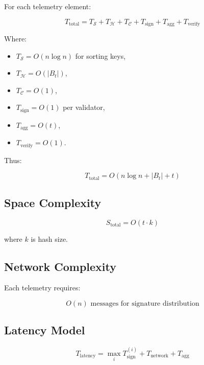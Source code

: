 For each telemetry element:

\begin{equation}
T_{\text{total}} = T_{\mathcal{S}} + T_{\mathcal{H}} + T_{\mathcal{C}} + T_{\text{sign}} + T_{\text{agg}} + T_{\text{verify}}
\end{equation}

Where:
\begin{itemize}
\item $T_{\mathcal{S}} = O(n \log n)$ for sorting keys,
\item $T_{\mathcal{H}} = O(|B_t|)$,
\item $T_{\mathcal{C}} = O(1)$,
\item $T_{\text{sign}} = O(1)$ per validator,
\item $T_{\text{agg}} = O(t)$,
\item $T_{\text{verify}} = O(1)$.
\end{itemize}

Thus:

\begin{equation}
T_{\text{total}} = O(n \log n + |B_t| + t)
\end{equation}

\subsection{Space Complexity}

\begin{equation}
S_{\text{total}} = O(t \cdot k)
\end{equation}

where $k$ is hash size.

\subsection{Network Complexity}

Each telemetry requires:

\begin{equation}
O(n) \text{ messages for signature distribution}
\end{equation}

\subsection{Latency Model}

\begin{equation}
T_{\text{latency}} = \max_i T_{\text{sign}}^{(i)} + T_{\text{network}} + T_{\text{agg}}
\end{equation}


